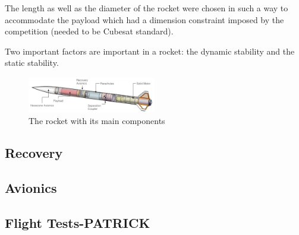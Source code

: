 The length as well as the diameter of the rocket were chosen in such a way to accommodate the payload which had a dimension constraint imposed by the competition (needed to be Cubesat standard).

Two important factors are important in a rocket: the dynamic stability and the static stability.




\begin{figure}[h!]
\centering
\includegraphics[width=0.5\textwidth]{img/rocket_sw_annotated.jpg}
\caption{The rocket with its main components}
\label{f:rocket_adnoted}
\end{figure}


\subsection{Recovery}

\subsection{Avionics}


\subsection{Flight Tests-PATRICK}